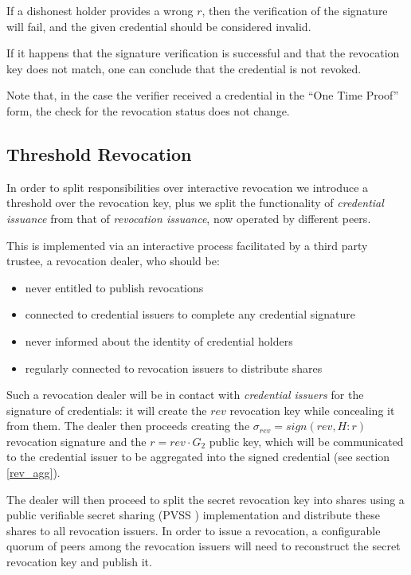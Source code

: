 If a dishonest holder provides a wrong $r$, then the verification of
the signature will fail, and the given credential should be considered
invalid.

If it happens that the signature verification is successful and that
the revocation key does not match, one can conclude that the
credential is not revoked.

Note that, in the case the verifier received a credential in the ``One
Time Proof'' form, the check for the revocation status does not
change.

\subsection{Threshold Revocation}

In order to split responsibilities over interactive revocation we
introduce a threshold over the revocation key, plus we split the
functionality of \textit{credential issuance} from that of
\textit{revocation issuance}, now operated by different peers.

This is implemented via an interactive process facilitated by a third
party trustee, a revocation dealer, who should be:
\begin{itemize}
    \item never entitled to publish revocations
    \item connected to credential issuers to complete any credential
      signature
    \item never informed about the identity of credential holders
    \item regularly connected to revocation issuers to distribute
      shares
\end{itemize}

Such a revocation dealer will be in contact with \textit{credential
  issuers} for the signature of credentials: it will create the $rev$
revocation key while concealing it from them. The dealer then proceeds
creating the $\sigma_{rev} = sign(rev, H : r)$ revocation signature
and the $r = rev \cdot G_2$ public key, which will be communicated to
the credential issuer to be aggregated into the signed credential (see
section \eqref{rev_agg}).

The dealer will then proceed to split the secret revocation key into
shares using a public verifiable secret sharing (PVSS \cite{pvss})
implementation and distribute these shares to all revocation
issuers. In order to issue a revocation, a configurable quorum of
peers among the revocation issuers will need to reconstruct the secret
revocation key and publish it.


